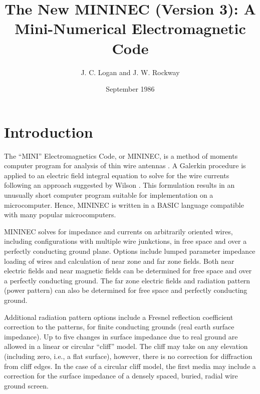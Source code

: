 \documentclass[12pt]{article}
\title{The New MININEC (Version 3): A Mini-Numerical Electromagnetic Code}
\author{J. C. Logan and J. W. Rockway}
\affil{Naval Ocean Systems Center San Diego}
\date{September 1986}
\begin{document}
\maketitle


\newcommand{\dd}[1]{\mathrm{d}#1}
\newcommand{\vect}[1]{\bar{#1}}
\newcommand{\Einc}{\vect{E}_{\mathrm{inc}}}
\newcommand{\Hplus}{\stackrel{H}{+}}
\newcommand{\Aplus}{\stackrel{A}{+}}
\newcommand{\Pin}{P_{\mbox{IN}}}
\newcommand{\ave}[1]{#1_{\mbox{ave}}}
\newcommand{\peak}[1]{#1_{\mbox{peak}}}
\newcommand{\bounce}[1]{#1_{\mbox{bounce}}}
\newcommand{\jj}{\mbox{j\,}}

\section{Introduction}
The ``MINI'' Electromagnetics Code, or MININEC, is a method of moments
computer program for analysis of thin wire antennas \cite{r1}. A
Galerkin procedure is applied to an electric field integral equation to
solve for the wire currents following an approach suggested by Wilson
\cite{r2}. This formulation results in an unusually short computer
program suitable for implementation on a microcomputer. Hence, MININEC
is written in a BASIC language compatible with many popular
microcomputers.

MININEC solves for impedance and currents on arbitrarily oriented wires,
including configurations with multiple wire junkctions, in free space
and over a perfectly conducting ground plane. Options include lumped
parameter impedance loading of wires and calculation of near zone and
far zone fields. Both near electric fields and near magnetic fields can
be determined for free space and over a perfectly conducting ground. The
far zone electric fields and radiation pattern (power pattern) can also
be determined for free space and perfectly conducting ground.

Additional radiation pattern options include a Fresnel reflection
coefficient correction to the patterns, for finite conducting grounds
(real earth surface impedance). Up to five changes in surface impedance
due to real ground are allowed in a linear or circular ``cliff'' model.
The cliff may take on any elevation (including zero, i.e., a flat
surface), however, there is no correction for diffraction from cliff
edges. In the case of a circular cliff model, the first media may
include a correction for the surface impedance of a densely spaced,
buried, radial wire ground screen.
\end{document}

